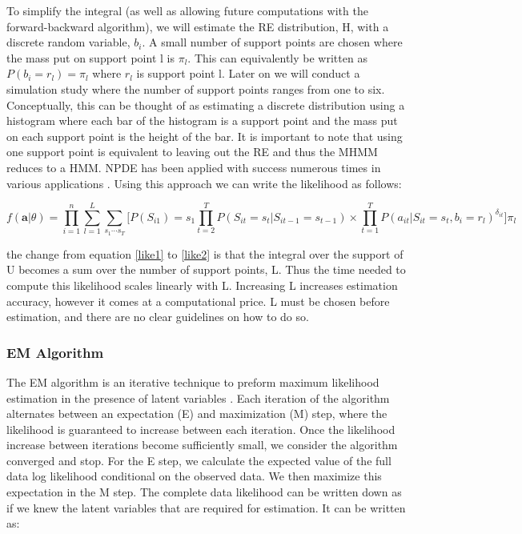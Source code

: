\documentclass{article}
\begin{document}
To simplify the integral (as well as allowing future computations 
with the forward-backward algorithm), we will estimate the RE 
distribution, H, with a discrete random variable, $b_i$. A small 
number of support points are chosen where the mass put on support 
point l is $\pi_l$. This can equivalently be written as 
$P(b_i = r_l) = \pi_l$ where $r_l$ is support point l. Later on 
we will conduct a simulation study where the number of support 
points ranges from one to six. Conceptually, this can be thought 
of as estimating a discrete distribution using a histogram where 
each bar of the histogram is a support point and the mass put on 
each support point is the height of the bar. It is important to 
note that using one support point is equivalent to leaving out 
the RE and thus the MHMM reduces to a HMM. NPDE has been applied 
with success numerous times in various applications \cite{izenman1991}. 
Using this approach we can write the likelihood as follows: 

\begin{equation}\label{like2}
f(\textbf{a}|\theta) = \prod_{i=1}^n \sum_{l=1}^L \sum_{{s_1}\cdots{s_T}} \biggr[ 
    P(S_{i1})=s_1\prod_{t=2}^T P(S_{it}=s_t|S_{it-1}=s_{t-1}) \times 
    \prod_{t=1}^T P(a_{it}|S_{it}=s_t,b_i=r_l)^{\delta_{it}} \biggr] \pi_l
\end{equation}

the change from equation \ref{like1} to \ref{like2} is that 
the integral over the support of U becomes a sum over the number 
of support points, L. Thus the time needed to compute this 
likelihood scales linearly with L. Increasing L increases 
estimation accuracy, however it comes at a computational price. 
L must be chosen before estimation, and there are no clear 
guidelines on how to do so. 

\subsubsection{EM Algorithm}

The EM algorithm is an iterative technique to preform maximum likelihood 
estimation in the presence of latent variables \cite{Baum1970}. 
Each iteration of the algorithm alternates between an expectation (E) 
and maximization (M) step, where the likelihood is guaranteed to 
increase between each iteration. Once the likelihood increase 
between iterations become sufficiently small, we consider the 
algorithm converged and stop. For the E step, we calculate the 
expected value of the full data log likelihood conditional on the 
observed data. We then maximize this expectation in the M step. The 
complete data likelihood can be written down as if we knew the 
latent variables that are required for estimation. It can be written as: 
\end{document}
